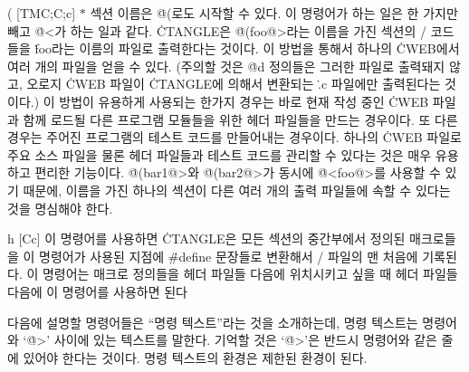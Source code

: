 \@( [TM\to C;\;C;\;c] $*$ 섹션 이름은 \.{@(}로도 시작할 수 있다. 이
명령어가 하는 일은 한 가지만 빼고 \.{@<}가 하는 일과 같다.
\.{CTANGLE}은 \.{@(foo@>}라는 이름을 가진 섹션의 \CEE/ 코드들을
\.{foo}라는 이름의 파일로 출력한다는 것이다. 이 방법을 통해서 하나의
\.{CWEB}에서 여러 개의 파일을 얻을 수 있다. (주의할 것은 \.{@d}
정의들은 그러한 파일로 출력돼지 않고, 오로지 \.{CWEB} 파일이
\.{CTANGLE}에 의해서 변환되는 \.{.c} 파일에만 출력된다는 것이다.) 이
방법이 유용하게 사용되는 한가지 경우는 바로 현재 작성 중인 \.{CWEB} 파일과
함께 로드될 다른 프로그램 모듈들을 위한 헤더 파일들을 만드는 경우이다.
또 다른 경우는 주어진 프로그램의 테스트 코드를 만들어내는
경우이다. 하나의 \.{CWEB} 파일로 주요 소스 파일을 물론 헤더 파일들과 테스트
코드를 관리할 수 있다는 것은 매우 유용하고 편리한 기능이다.  
\.{@(bar1@>}와 \.{@(bar2@>}가 동시에 \.{@<foo@>}를 사용할 수 있기 때문에,
이름을 가진 하나의 섹션이 다른 여러 개의 출력 파일들에 속할 수 있다는 것을
명심해야 한다.   

\@{h} [Cc] 이 명령어를 사용하면 \.{CTANGLE}은 모든 섹션의 중간부에서
정의된 매크로들을 이 명령어가 사용된 지점에 \.{\#define} 문장들로
변환해서 \CEE/ 파일의 맨 처음에 기록된다. 이
명령어는 매크로 정의들을 헤더 파일들 다음에 위치시키고 싶을 때 헤더
파일들 다음에 이 명령어를 사용하면 된다

\subsec
다음에 설명할 명령어들은 ``명령 텍스트''라는 것을
소개하는데, 명령 텍스트는 
명령어와 `\.{@>}' 사이에 있는 텍스트를 말한다. 기억할 것은
`\.{@>}'은 반드시 명령어와 같은 줄에 있어야 한다는 것이다. 
명령 텍스트의 환경은 제한된 환경이 된다. 

